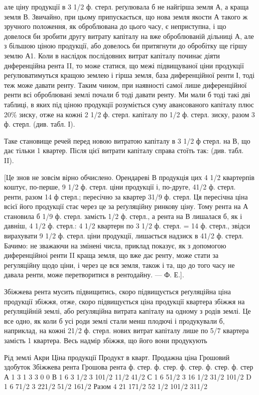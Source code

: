 але ціну продукції в 3 1/2 ф. стерл. реґулювала б не найгірша земля А, а краща
земля В. Звичайно, при цьому припускається, що нова земля якости А такого
ж зручного положення, як оброблювана до цього часу, є неприступна, і що довелося
би зробити другу витрату капіталу на вже оброблюваній дільниці А, але
з більшою ціною продукції, або довелось би притягнути до обробітку ще гіршу
землю А1. Коли в наслідок послідовних витрат капіталу починає діяти днференційна
рента II, то може статися, що межі підвищуваної ціни продукції реґулюватимуться
кращою землею і гірша земля, база диференційної ренти І, тоді
теж може давати ренту. Таким чином, при наявності самої лише диференційної
ренти всі оброблювані землі почали б тоді давати ренту. Ми мали б тоді такі
дві таблиці, в яких під ціною продукції розуміється суму авансованого капіталу
плюс 20\%  зиску, отже на кожні 2 1/2 ф. стерл. капіталу по 1/2 ф. стерл.
зиску, разом 3 ф. стерл. (див. табл. І).

Таке становище
речей перед новою
витратою капіталу в
3 1/2 ф стерл. на В,
що дає тільки 1 квартер.
Після цієї витрати
капіталу справа
стоїть так: (див.
табл. II).

[Це знов не зовсім
вірно обчислено.
Орендареві В продукція
цих 4 1/2 квартерпів
коштує, по-перше,
9 1/2 ф. стерл.
ціни продукції і, по-друге,
41/2 ф. стерл.
ренти, разом 14 ф
стерл.; пересічно за
квартер 31/9 ф. стерл.
Ця пересічна ціна
всієї його продукції
стає через це за реґуляційну
ринкову
ціну. Тому рента на
А становила б 1/9 ф.
стерл. замість 1/2 ф. стерл., а рента на В лишалася б, як і давніш, 4 1/2 ф.
стерл.: 4 1/2 квартерн по 3 1/2 ф. стерл. = 14 ф. стерл., звідси вирахувати
9 1/2 ф. стерл. ціни продукції, лишається надзиск в 41/2 ф. стерл. Бачимо: не
зважаючи на змінені числа, приклад показує, як з допомогою диференційноі
ренти II краща земля, що вже дає ренту, може стати за регуляційну щодо ціни,
і через це вся земля, також і та, що до того часу не давала ренти, може перетворитися
в рентодайну. — Ф. Е.].

Збіжжева рента мусить підвищитись, скоро підвищується реґуляційна
ціна продукції збіжжя, отже, скоро підвищується ціна продукції квартера збіжжя
на реґуляційній землі, або реґуляційна витрата капіталу на одному з родів
землі. Це все одно, як коли б усі роди землі стали менш плодючі і продукували
б, наприклад, на кожні 21/2 ф. стерл. нових витрат капіталу лише по 5/7
квартера замість 1 квартера. Весь надмір збіжжя, що його вони продукують

Рід землі    Акри    Ціна продукції    Продукт в кварт. Продажна  ціна    Грошовий  здобуток   
Збіжжева рента    Грошова  рента
        ф. стер. ф. стер. ф. стер. ф. стер. ф. стер
А 1 3 1 3 3 0 0
В                    1    6    3 1/2    3    101/2    11/2    41/2
С                    1    6    51/2    3    16 1/2    31/2    101/2
D                    1    6    71/2    3    221/2    51/2    161/2
Разом          4    21    171/2        52 1/2    101/2    311/2

